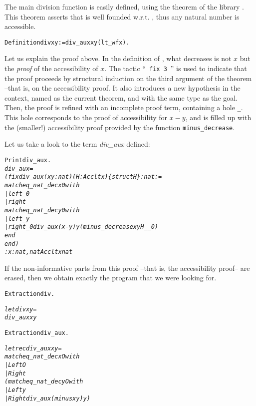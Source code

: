 \documentclass[11pt]{article}
\begin{document}
The main division function is easily defined, using the theorem
 of the library . This theorem asserts that
 is well founded w.r.t. , thus any natural number
is accessible.
\begin{alltt}
Definition div x y := div_aux x y (lt_wf x).
\end{alltt}

Let us explain the proof above. In the definition of ,
what decreases is not $x$ but the \textsl{proof} of the accessibility
of $x$. The tactic ``~\texttt{fix 3}~'' is used to indicate that the proof
proceeds by structural induction on the third argument of the theorem
--that is, on the accessibility proof. It also introduces a new
hypothesis in the context, named as the current theorem, and with the
same type as the goal. Then, the proof is refined with an incomplete
proof term, containing a hole \texttt{\_}.  This hole corresponds to the proof
of accessibility for $x-y$, and is filled up with the (smaller!)
accessibility proof provided by the function \texttt{minus\_decrease}.


\noindent Let us take a look to the term \textsl{div\_aux} defined:

\pagebreak
\begin{alltt}
Print div_aux.
\it
div_aux =
(fix div_aux (x y : nat) (H : Acc lt x) \{struct H\} : nat :=
   match eq_nat_dec x 0 with
   | left _ {\funarrow} 0
   | right _ {\funarrow}
       match eq_nat_dec y 0 with
       | left _ {\funarrow} y
       | right _0 {\funarrow} div_aux (x - y) y (minus_decrease x y H _ _0)
       end
   end)
     : {\prodsym} x : nat, nat {\arrow} Acc lt x {\arrow} nat

\end{alltt}

If the non-informative parts from this proof --that is, the
accessibility proof-- are erased, then we obtain exactly the program
that we were looking for.
\begin{alltt}

Extraction div.

\it
let div x y =
  div_aux x y
\tt

Extraction div_aux.

\it
let rec div_aux x y =
  match eq_nat_dec x O with
    | Left {\arrow} O
    | Right {\arrow}
        (match eq_nat_dec y O with
           | Left {\arrow} y
           | Right {\arrow} div_aux (minus x y) y)
\end{alltt}
\end{document}
